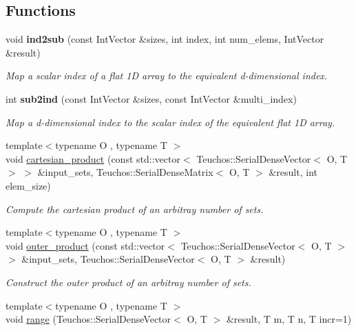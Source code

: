 \subsection*{Functions}
\begin{DoxyCompactItemize}
\item 
void {\bfseries ind2sub} (const Int\+Vector \&sizes, int index, int num\+\_\+elems, Int\+Vector \&result)
\begin{DoxyCompactList}\small\item\em Map a scalar index of a flat 1D array to the equivalent d-\/dimensional index. \end{DoxyCompactList}\item 
int {\bfseries sub2ind} (const Int\+Vector \&sizes, const Int\+Vector \&multi\+\_\+index)
\begin{DoxyCompactList}\small\item\em Map a d-\/dimensional index to the scalar index of the equivalent flat 1D array. \end{DoxyCompactList}\item 
{\footnotesize template$<$typename O , typename T $>$ }\\void \hyperlink{MathTools_8hpp_a3731ebd8f88288feeadbf520bf87b5d2}{cartesian\+\_\+product} (const std\+::vector$<$ Teuchos\+::\+Serial\+Dense\+Vector$<$ O, T $>$ $>$ \&input\+\_\+sets, Teuchos\+::\+Serial\+Dense\+Matrix$<$ O, T $>$ \&result, int elem\+\_\+size)
\begin{DoxyCompactList}\small\item\em Compute the cartesian product of an arbitray number of sets. \end{DoxyCompactList}\item 
{\footnotesize template$<$typename O , typename T $>$ }\\void \hyperlink{MathTools_8hpp_acb4af3a3f366ed9ad56f9ff808ab179e}{outer\+\_\+product} (const std\+::vector$<$ Teuchos\+::\+Serial\+Dense\+Vector$<$ O, T $>$ $>$ \&input\+\_\+sets, Teuchos\+::\+Serial\+Dense\+Vector$<$ O, T $>$ \&result)
\begin{DoxyCompactList}\small\item\em Construct the outer product of an arbitray number of sets. \end{DoxyCompactList}\item 
{\footnotesize template$<$typename O , typename T $>$ }\\void \hyperlink{MathTools_8hpp_a10c289ea3f98707b1e460afa67c204e8}{range} (Teuchos\+::\+Serial\+Dense\+Vector$<$ O, T $>$ \&result, T m, T n, T incr=1)

\end{DoxyCompactItemize}
